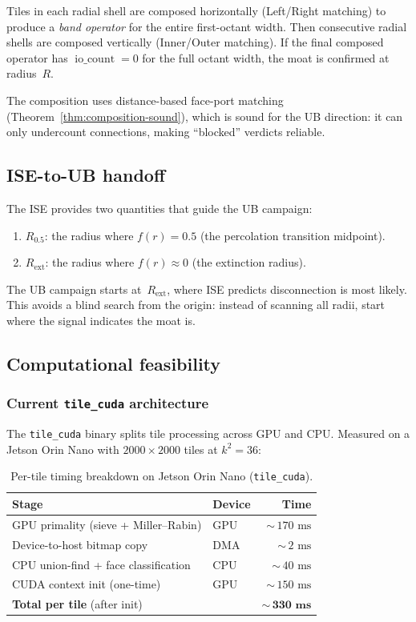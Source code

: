 \documentclass[11pt,a4paper]{article}
\newcommand{\fr}{f(r)}
\newcommand{\Rhalf}{R_{0.5}}
\newcommand{\iocount}{\operatorname{io\_count}}
\theoremstyle{definition}
\theoremstyle{plain}
\theoremstyle{remark}
\begin{document}
Tiles in each radial shell are composed horizontally (Left/Right matching) to produce a \emph{band operator} for the entire first-octant width.  Then consecutive radial shells are composed vertically (Inner/Outer matching).  If the final composed operator has $\iocount = 0$ for the full octant width, the moat is confirmed at radius~$R$.

The composition uses distance-based face-port matching (Theorem~\ref{thm:composition-sound}), which is sound for the UB direction: it can only undercount connections, making ``blocked'' verdicts reliable.

\subsection{ISE-to-UB handoff}

The ISE provides two quantities that guide the UB campaign:
\begin{enumerate}
  \item $\Rhalf$: the radius where $\fr = 0.5$ (the percolation transition midpoint).
  \item $R_{\text{ext}}$: the radius where $\fr \approx 0$ (the extinction radius).
\end{enumerate}
The UB campaign starts at~$R_{\text{ext}}$, where ISE predicts disconnection is most likely.  This avoids a blind search from the origin: instead of scanning all radii, start where the signal indicates the moat is.

\subsection{Computational feasibility}\label{sec:ub-feasibility}

\subsubsection{Current \texttt{tile\_cuda} architecture}

The \texttt{tile\_cuda} binary splits tile processing across GPU and CPU\@.  Measured on a Jetson Orin Nano with $2000 \times 2000$ tiles at $k^2 = 36$:

\begin{table}[ht]
\centering
\begin{tabular}{@{}llr@{}}
\toprule
Stage & Device & Time \\
\midrule
GPU primality (sieve + Miller--Rabin)  & GPU & ${\sim}\,170\text{ ms}$ \\
Device-to-host bitmap copy             & DMA & ${\sim}\,2\text{ ms}$ \\
CPU union-find + face classification   & CPU & ${\sim}\,40\text{ ms}$ \\
CUDA context init (one-time)           & GPU & ${\sim}\,150\text{ ms}$ \\
\midrule
\textbf{Total per tile} (after init)   &     & $\mathbf{{\sim}\,330\textbf{ ms}}$ \\
\bottomrule
\end{tabular}
\caption{Per-tile timing breakdown on Jetson Orin Nano (\texttt{tile\_cuda}).}
\label{tab:tile-cuda-timing}
\end{table}
\end{document}
